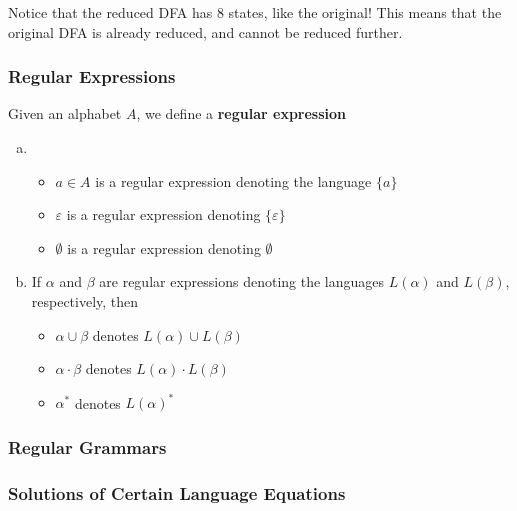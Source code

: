 Notice that the reduced DFA has 8 states, like the original! This means that the original DFA is already reduced, and cannot be reduced further.

\subsubsection{Regular Expressions}
\begin{definition}
Given an alphabet $A$, we define a \textbf{regular expression}
\begin{enumerate}[(a)]
    \item \begin{itemize}
        \item $a\in A$ is a regular expression denoting the language $\{a\}$
        \item $\varepsilon$ is a regular expression denoting $\{\varepsilon\}$
        \item $\emptyset$ is a regular expression denoting $\emptyset$
    \end{itemize}
    
    \item If $\alpha$ and $\beta$ are regular expressions denoting the languages $L(\alpha)$ and $L(\beta)$, respectively, then 
    \begin{itemize}
        \item $\alpha\cup\beta$ denotes $L(\alpha)\cup L(\beta)$
        \item $\alpha\cdot\beta$ denotes $L(\alpha)\cdot L(\beta)$
        \item $\alpha^*$ denotes $L(\alpha)^*$
    \end{itemize}
\end{enumerate}
\end{definition}

\subsubsection{Regular Grammars}
\subsubsection{Solutions of Certain Language Equations}